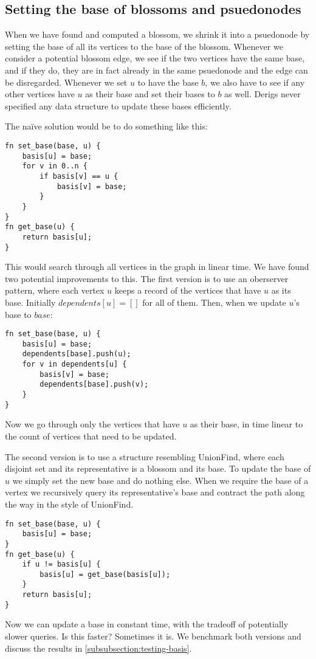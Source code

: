 \subsection{Setting the base of blossoms and psuedonodes}
\label{subsection:basis-code}
When we have found and computed a blossom, we shrink it into a psuedonode by setting the base of all its vertices to the base of the blossom. Whenever we consider a potential blossom edge, we see if the two vertices have the same base, and if they do, they are in fact already in the same psuedonode and the edge can be disregarded. Whenever we set $u$ to have the base $b$, we also have to see if any other vertices have $u$ as their base and set their bases to $b$ as well. Derigs never specified any data structure to update these bases efficiently.

The naïve solution would be to do something like this:
\begin{lstlisting}[caption={Näive basis},label=Listing,mathescape=true]
fn set_base(base, u) {
    basis[u] = base;
    for v in 0..n {
        if basis[v] == u {
            basis[v] = base;
        }
    }
}
fn get_base(u) {
    return basis[u];
}
\end{lstlisting}
This would search through all vertices in the graph in linear time. We have found two potential improvements to this. The first version is to use an oberserver pattern, where each vertex $u$ keeps a record of the vertices that have $u$ as its base. Initially $dependents[u] = []$ for all of them. Then, when we update $u$'s base to $base$:

\begin{lstlisting}[caption={Observer basis},label=Listing,mathescape=true]
fn set_base(base, u) {
    basis[u] = base;
    dependents[base].push(u);
    for v in dependents[u] {
        basis[v] = base;
        dependents[base].push(v);
    }
}
\end{lstlisting}

Now we go through only the vertices that have $u$ as their base, in time linear to the count of vertices that need to be updated.

The second version is to use a structure resembling UnionFind, where each disjoint set and its representative is a blossom and its base. To update the base of $u$ we simply set the new base and do nothing else. When we require the base of a vertex we recursively query its representative's base and contract the path along the way in the style of UnionFind. 

\begin{lstlisting}[caption={UF-like basis},label=Listing,mathescape=true]
fn set_base(base, u) {
    basis[u] = base;
}
fn get_base(u) {
    if u != basis[u] {
        basis[u] = get_base(basis[u]);
    }
    return basis[u];
}

\end{lstlisting}

Now we can update a base in constant time, with the tradeoff of potentially slower queries. Is this faster? Sometimes it is. We benchmark both versions and discuss the results in \ref{subsubsection:testing-basis}.
